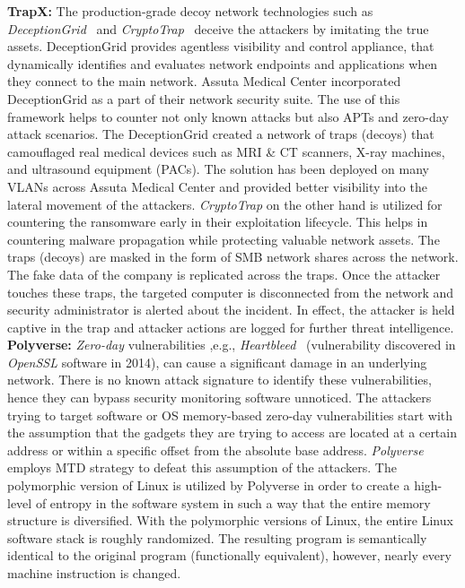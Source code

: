 \textbf{TrapX:} The production-grade decoy network technologies such as \emph{DeceptionGrid}~ and \emph{CryptoTrap}~ deceive the attackers by imitating the true assets. DeceptionGrid provides {agentless} visibility and control appliance, that dynamically identifies and evaluates {network endpoints} and {applications} when they connect to the main network. {Assuta Medical Center} incorporated DeceptionGrid as a part of their network security suite. The use of this framework helps to counter not only known attacks but also APTs and {zero-day} attack scenarios. The DeceptionGrid created a network of {traps} (decoys) that camouflaged real medical devices such as {MRI} \& {CT scanners}, {X-ray machines}, and {ultrasound equipment} (PACs). The solution has been deployed on many {VLANs} across {Assuta Medical Center} and provided better visibility into the lateral movement of the attackers. 
\textit{CryptoTrap} on the other hand is utilized for {countering} the {ransomware} early in their exploitation lifecycle. This helps in countering malware propagation while protecting valuable network assets. The traps (decoys) are masked in the form of {SMB network shares} across the network. The fake data of the company is replicated across the traps. Once the attacker touches these traps, the targeted computer is disconnected from the network and security administrator is alerted about the incident. In effect, the attacker is held captive in the trap and attacker actions are logged for further {threat intelligence}. 
\textbf{Polyverse:} \emph{Zero-day} vulnerabilities ,e.g., \emph{Heartbleed}~ (vulnerability discovered in  \textit{OpenSSL} software in 2014), can cause a significant damage in an underlying network. There is no known attack signature to identify these vulnerabilities, hence they can {bypass} security {monitoring software} unnoticed.
The attackers trying to target software or OS {memory-based zero-day} vulnerabilities start with the assumption that the gadgets they are trying to access are located at a certain address or within a specific offset from the absolute base address. \emph{Polyverse}~ employs MTD strategy to defeat this assumption of the attackers. The polymorphic version of Linux is utilized by Polyverse in order to create a high-level of {entropy} in the software system in such a way that the entire {memory} structure is {diversified}. With the polymorphic versions of Linux, the entire Linux software stack is roughly randomized. The resulting program is semantically identical to the original program (functionally equivalent), however, nearly every machine instruction is changed. 

